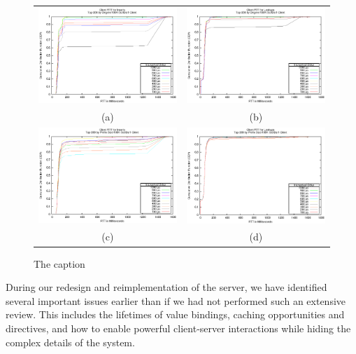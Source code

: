 \documentclass{article}
\begin{document}
\begin{figure}[t]
	\begin{center}
		\begin{tabular}{cc}
			\includegraphics[width=0.5\linewidth]{fig/clt-ins-deg} &
			\includegraphics[width=0.5\linewidth]{fig/clt-lkp-deg} \\
			(a) & (b) \\
			\includegraphics[width=0.5\linewidth]{fig/clt-ins-pre} &
			\includegraphics[width=0.5\linewidth]{fig/clt-lkp-pre} \\
			(c) & (d) \\
		\end{tabular}
		\caption{The caption}
		\label{fig:results}
	\end{center}
\end{figure}

During our redesign and reimplementation of the server, we have identified
several important issues earlier than if we had not performed such an
extensive review.  This includes the lifetimes of value bindings, caching
opportunities and directives, and how to enable powerful client-server
interactions while hiding the complex details of the system.



\end{document}
